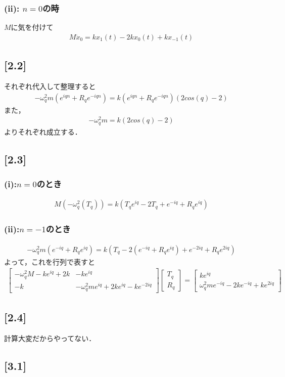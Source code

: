 \documentclass[12pt,dvipdfmx]{jsarticle}
\begin{document}
\subsubsection*{(ii): $n=0$の時}
$M$に気を付けて
\begin{eqnarray}
  M\ddot{x}_0 = k x_{1}(t)- 2k x_0(t) + k x_{-1}(t)
\end{eqnarray}
\subsection*{\large{[2.2]}}
それぞれ代入して整理すると
\begin{eqnarray}
  -\omega_q^2m \left( e^{iqn}+ R_q e^{-iqn} \right) =k\left( e^{iqn}+ R_q e^{-iqn} \right) \left( 2cos(q)-2 \right)
\end{eqnarray}
また，
\begin{eqnarray}
  -\omega_q^2m = k\left( 2cos(q)-2 \right)
\end{eqnarray}
よりそれぞれ成立する．
\subsection*{\large{[2.3]}}
\subsubsection*{(i):$n=0$のとき}
\begin{eqnarray}
  M\left( -\omega_q^2\left( T_q \right) \right) = k\left( T_q e^{iq}-2T_q+e^{-iq} + R_q e^{iq} \right) 
\end{eqnarray}

\subsubsection*{(ii):$n=-1$のとき}
\begin{eqnarray}
  -\omega_q^2m \left( e^{-iq} + R_q e^{iq} \right) = k\left( T_q-2 \left( e^{-iq} + R_q e^{iq} \right) + e^{-2iq} + R_q e^{2iq} \right)
\end{eqnarray}
よって，これを行列で表すと
\begin{eqnarray}
  \begin{bmatrix}
    -\omega_q^2M -ke^{iq}+2k & -ke^{iq} \\
    -k & -\omega_q^2 m e^{iq} + 2ke^{iq}-k e^{-2iq}
  \end{bmatrix}
  \begin{bmatrix}
    T_q \\
    R_q
  \end{bmatrix}
  =
  \begin{bmatrix}
    ke^{iq} \\
    \omega_q^2 m e^{-iq} -2ke^{-iq}+k e^{2iq}
  \end{bmatrix}
\end{eqnarray}
\subsection*{\large{[2.4]}}
計算大変だからやってない．
\subsection*{\large{[3.1]}}
\end{document}
